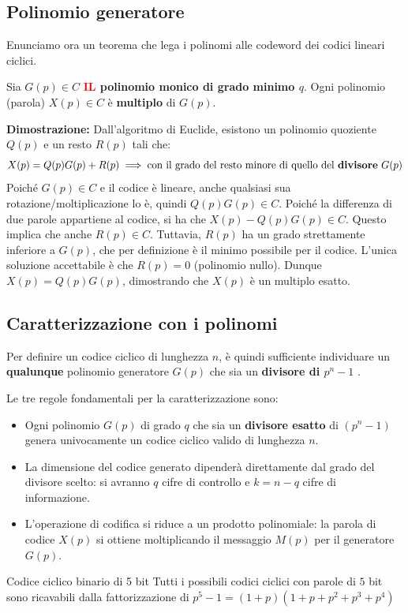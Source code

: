 \subsection{Polinomio generatore}
Enunciamo ora un teorema che lega i polinomi alle codeword dei codici lineari ciclici.

Sia $G(p) \in C$ \textbf{\textcolor{red}{IL} polinomio monico di grado minimo $q$}. Ogni polinomio (parola) $X(p) \in C$ è \textbf{multiplo} di $G(p)$.

\textbf{Dimostrazione:} Dall'algoritmo di Euclide, esistono un polinomio quoziente $Q(p)$ e un resto $R(p)$ tali che:
\[ X(p) = Q(p)G(p) + R(p) \implies \text{con il grado del resto minore di quello del \textbf{divisore} } G(p) \]
Poiché $G(p) \in C$ e il codice è lineare, anche qualsiasi sua rotazione/moltiplicazione lo è, quindi $Q(p)G(p) \in C$. Poiché la differenza di due parole appartiene al codice, si ha che $X(p)-Q(p)G(p) \in C$.
Questo implica che anche $R(p) \in C$. Tuttavia, $R(p)$ ha un grado strettamente inferiore a $G(p)$, che per definizione è il minimo possibile per il codice. L'unica soluzione accettabile è che $R(p) = 0$ (polinomio nullo). 
Dunque $X(p) = Q(p)G(p)$, dimostrando che $X(p)$ è un multiplo esatto.

\subsection{Caratterizzazione con i polinomi}
Per definire un codice ciclico di lunghezza $n$, è quindi sufficiente individuare un \textbf{qualunque} polinomio generatore $G(p)$ che sia un \textbf{divisore di $p^n - 1$} .

Le tre regole fondamentali per la caratterizzazione sono:

\begin{itemize}
    \item Ogni polinomio $G(p)$ di grado $q$ che sia un \textbf{divisore esatto} di $(p^n - 1)$ genera univocamente un codice ciclico valido di lunghezza $n$.
    \item La dimensione del codice generato dipenderà direttamente dal grado del divisore scelto: si avranno $q$ cifre di controllo e $k = n - q$ cifre di informazione.
    \item L'operazione di codifica si riduce a un prodotto polinomiale: la parola di codice $X(p)$ si ottiene moltiplicando il messaggio $M(p)$ per il generatore $G(p)$.
\end{itemize}

\begin{esempio}{Codice ciclico binario di 5 bit}
Tutti i possibili codici ciclici con parole di $5$ bit sono ricavabili dalla fattorizzazione di $p^5-1=(1+p)(1+p+p^2+p^3+p^4)$
\end{esempio}

